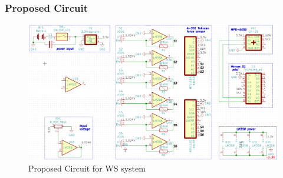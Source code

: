 \documentclass[12pt,a4paper]{article}
\begin{document}
\subsubsection{Proposed Circuit}
\begin{figure}[hbt!]
\includegraphics[width = 170mm]{full_circuit.png}
\caption{Proposed Circuit for WS system}
\end{figure}
\end{document}
